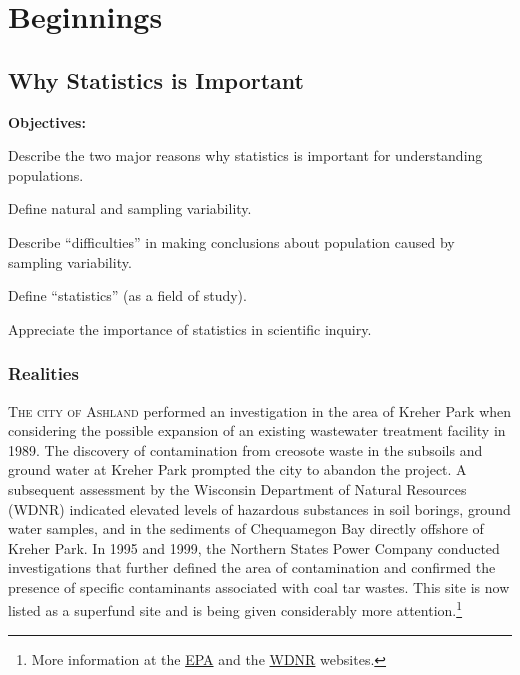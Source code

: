 \documentclass[10pt,openany]{book}\usepackage[]{graphicx}\usepackage[]{color}
\begin{document}
  \frontmatter
    

  \mainmatter
    \part{Beginnings}



\chapter{Why Statistics is Important} \label{chap:WhyStatsImportant}
\begin{ChapObj}{\boxwidth}
  \textbf{Objectives:}
  \begin{Enumerate}
    \item Describe the two major reasons why statistics is important for understanding populations.
    \item Define natural and sampling variability.
    \item Describe ``difficulties'' in making conclusions about population caused by sampling variability.
    \item Define ``statistics'' (as a field of study).
    \item Appreciate the importance of statistics in scientific inquiry.
  \end{Enumerate}
\end{ChapObj}

\minitoc
\newpage

\section{Realities}\label{sect:Realities}
\lettrine{T}{he city of Ashland} performed an investigation in the area of Kreher Park  when considering the possible expansion of an existing wastewater treatment facility in 1989. The discovery of contamination from creosote waste in the subsoils and ground water at Kreher Park prompted the city to abandon the project. A subsequent assessment by the Wisconsin Department of Natural Resources (WDNR) indicated elevated levels of hazardous substances in soil borings, ground water samples, and in the sediments of Chequamegon Bay directly offshore of Kreher Park. In 1995 and 1999, the Northern States Power Company conducted investigations that further defined the area of contamination and confirmed the presence of specific contaminants associated with coal tar wastes. This site is now listed as a superfund site and is being given considerably more attention.\footnote{More information at the \href{https://cumulis.epa.gov/supercpad/cursites/csitinfo.cfm?id=0507952}{EPA} and the \href{http://dnr.wi.gov/topic/brownfields/ashland.html}{WDNR} websites.}
\end{document}
